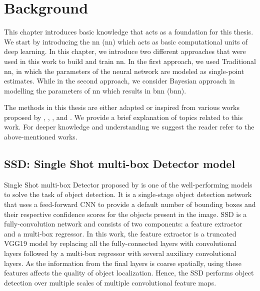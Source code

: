 

    \justifying
    \chapter{Background}
    This chapter introduces basic knowledge that acts as a foundation for this thesis. We start by introducing the \acrlong{nn} (\acrshort{nn}) which acts as basic computational units of deep learning. In this chapter, we introduce two different approaches that were used in this work to build and train \acrshort{nn}. In the first approach, we used Traditional \acrshort{nn}, in which the parameters of the neural network are modeled as single-point estimates. While in the second approach, we consider Bayesian approach in modelling the parameters of \acrshort{nn} which results in \acrlong{bnn} (\acrshort{bnn}). 
    
    The methods in this thesis are either adapted or inspired from various works proposed by \citet{Goodfellow-et-al-2016}, \citet{jaynes_2003}, \citet{gal2016uncertainty}, and \citet{russell2002artificial}. We provide a brief explanation of topics related to this work. For deeper knowledge and understanding we suggest the reader refer to the above-mentioned works.
    
    \section{SSD: Single Shot multi-box Detector model}
    \label{ssd_background}
    Single Shot multi-box Detector proposed by \citet{Liu2016SSDSS} is one of the well-performing models to solve the task of object detection. It is a single-stage object detection network that uses a feed-forward CNN to provide a default number of bounding boxes and their respective confidence scores for the objects present in the image. SSD is a fully-convolution network and consists of two components: a feature extractor and a multi-box regressor. In this work, the feature extractor is a truncated VGG19 model \cite{Simonyan2015} by replacing all the fully-connected layers with convolutional layers followed by a multi-box regressor with several auxiliary convolutional layers. As the information from the final layers is coarse spatially, using these features affects the quality of object localization. Hence, the SSD performs object detection over multiple scales of multiple convolutional feature maps.
    
